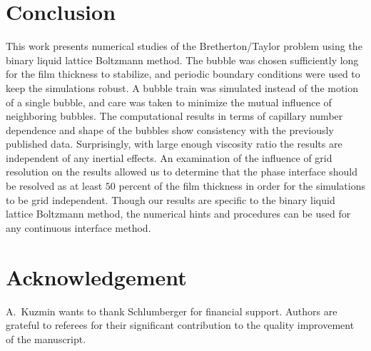 \documentclass[preprint,12pt]{elsarticle}
\begin{document}
\section{Conclusion}
This work presents numerical studies of the
Bretherton/Taylor problem using the binary liquid lattice Boltzmann method. The bubble was chosen sufficiently long for the film
thickness to
stabilize, and periodic boundary conditions were used to keep the simulations robust.  A bubble
train was simulated instead of the motion of a single bubble, and care was taken to minimize
the mutual influence of neighboring bubbles. The computational
results in terms of capillary number dependence and shape of the bubbles show consistency with the
previously published data. Surprisingly, with large enough viscosity ratio the results are
independent of any inertial effects.  An examination of the influence of grid resolution on the results allowed
us to determine that the phase interface should be resolved as at least $50$ percent of the film thickness
in order for the simulations to be grid independent. Though our results are specific to the binary liquid lattice
Boltzmann method, the numerical hints and procedures can be used for any
continuous interface method.
\section{Acknowledgement}
A.~Kuzmin wants to thank Schlumberger for financial support. Authors are grateful to referees
for their significant contribution to the quality improvement of the manuscript.


%
%
\end{document}
